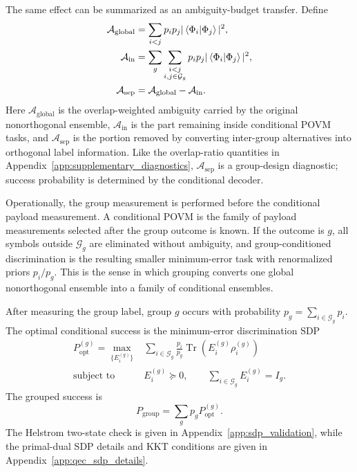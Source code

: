 \documentclass[
 reprint,
 amsmath,amssymb,
 aps,
 pra,
 floatfix,
]{revtex4-2}
\begin{document}
The same effect can be summarized as an ambiguity-budget transfer. Define
\begin{align}
    \mathcal A_{\mathrm{global}}
    &=
    \sum_{i<j}p_ip_j|\braket{\Phi_i|\Phi_j}|^2,\nonumber\\
    \mathcal A_{\mathrm{in}}
    &=
    \sum_g\sum_{\substack{i<j\\ i,j\in\mathcal G_g}}
    p_ip_j|\braket{\Phi_i|\Phi_j}|^2,\nonumber\\
    \mathcal A_{\mathrm{sep}}
    &=
    \mathcal A_{\mathrm{global}}-\mathcal A_{\mathrm{in}} .
    \label{eq:ambiguity_budget_transfer}
\end{align}
Here \(\mathcal A_{\mathrm{global}}\) is the overlap-weighted ambiguity carried by the original nonorthogonal ensemble, \(\mathcal A_{\mathrm{in}}\) is the part remaining inside conditional POVM tasks, and \(\mathcal A_{\mathrm{sep}}\) is the portion removed by converting inter-group alternatives into orthogonal label information. Like the overlap-ratio quantities in Appendix~\ref{app:supplementary_diagnostics}, \(\mathcal A_{\mathrm{sep}}\) is a group-design diagnostic; success probability is determined by the conditional decoder.

Operationally, the group measurement is performed before the conditional payload measurement. A conditional POVM is the family of payload measurements selected after the group outcome is known. If the outcome is $g$, all symbols outside $\mathcal G_g$ are eliminated without ambiguity, and group-conditioned discrimination is the resulting smaller minimum-error task with renormalized priors $p_i/p_g$. This is the sense in which grouping converts one global nonorthogonal ensemble into a family of conditional ensembles.

After measuring the group label, group $g$ occurs with probability $p_g=\sum_{i\in\mathcal G_g}p_i$. The optimal conditional success is the minimum-error discrimination SDP
\begin{align}
    P_{\mathrm{opt}}^{(g)}
    =
    \max_{\{E_i^{(g)}\}}
    &\sum_{i\in\mathcal G_g}
    \frac{p_i}{p_g}
    \operatorname{Tr}(E_i^{(g)}\rho_i^{(g)})
    \label{eq:group_sdp_main}\\
    \text{subject to}\quad
    &E_i^{(g)}\succeq0,\qquad
    \sum_{i\in\mathcal G_g}E_i^{(g)}=I_g .
    \nonumber
\end{align}
The grouped success is
\begin{equation}
    P_{\mathrm{group}}=\sum_g p_gP_{\mathrm{opt}}^{(g)}.
    \label{eq:p_group_main}
\end{equation}
The Helstrom two-state check is given in Appendix~\ref{app:sdp_validation}, while the primal-dual SDP details and KKT conditions are given in Appendix~\ref{app:qec_sdp_details}.
\end{document}
